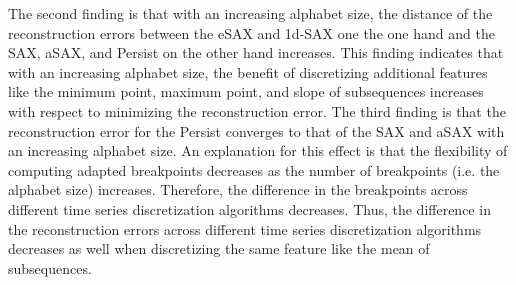 The second finding is that with an increasing alphabet size, the distance of the reconstruction errors between the \ac{eSAX} and \ac{1d-SAX} one the one hand and the \ac{SAX}, \ac{aSAX}, and Persist on the other hand increases. This finding indicates that with an increasing alphabet size, the benefit of discretizing additional features like the minimum point, maximum point, and slope of subsequences increases with respect to minimizing the reconstruction error. \newline
The third finding is that the reconstruction error for the Persist converges to that of the \ac{SAX} and \ac{aSAX} with an increasing alphabet size. An explanation for this effect is that the flexibility of computing adapted breakpoints decreases as the number of breakpoints (i.e. the alphabet size) increases. Therefore, the difference in the breakpoints across different time series discretization algorithms decreases. Thus, the difference in the reconstruction errors across different time series discretization algorithms decreases as well when discretizing the same feature like the mean of subsequences.
